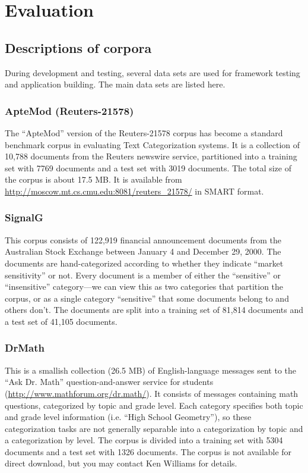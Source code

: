 \chapter{Evaluation}

\section{Descriptions of corpora}
During development and testing, several data sets are used for
framework testing and application building.  The main data sets are
listed here.


\subsection{ApteMod (Reuters-21578)}


The ``ApteMod'' version of the Reuters-21578 corpus has become a
standard benchmark corpus in evaluating Text Categorization systems.
It is a collection of 10,788 documents from the Reuters newswire
service, partitioned into a training set with 7769 documents and a
test set with 3019 documents.  The total size of the corpus is about
17.5 MB.  It is available from
\url{http://moscow.mt.cs.cmu.edu:8081/reuters_21578/} in SMART format.


\subsection{SignalG}
This corpus consists of 122,919 financial announcement documents from
the Australian Stock Exchange between January 4 and December 29, 2000.
The documents are hand-categorized according to whether they indicate
``market sensitivity'' or not.  Every document is a member of either the
``sensitive'' or ``insensitive'' category---we can view this as two
categories that partition the corpus, or as a single category
``sensitive'' that some documents belong to and others don't.  The
documents are split into a training set of 81,814 documents and a test
set of 41,105 documents.


\subsection{DrMath}
This is a smallish collection (26.5 MB) of English-language messages
sent to the ``Ask Dr. Math'' question-and-answer service for students
(\url{http://www.mathforum.org/dr.math/}).  It consists of messages
containing math questions, categorized by topic and grade level.  Each
category specifies both topic and grade level information (i.e. ``High
School Geometry''), so these categorization tasks are not generally
separable into a categorization by topic and a categorization by
level.  The corpus is divided into a training set with 5304 documents
and a test set with 1326 documents.  The corpus is not available for
direct download, but you may contact Ken Williams for details.


